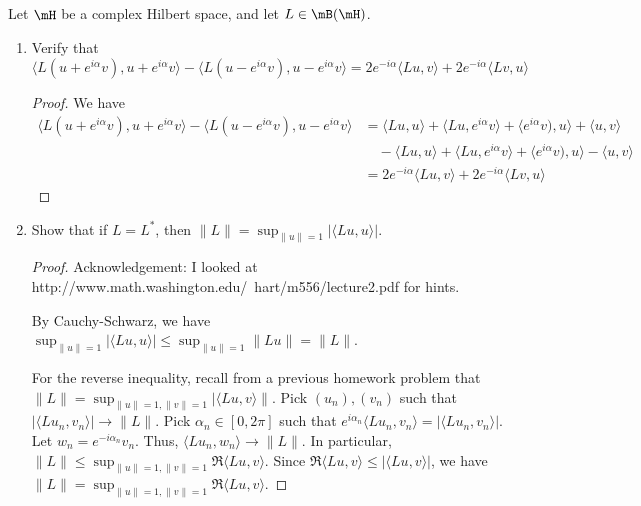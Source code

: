 \documentclass{article}
\begin{document}
 Let $\mH$ be a complex Hilbert space, and let $L \in \mB(\mH)$.
\begin{enumerate}
\item Verify that 
$\langle L(u + e^{i \alpha} v), u + e^{i \alpha} v \rangle - 
\langle L(u - e^{i \alpha} v), u - e^{i \alpha} v \rangle
= 2 e^{-i \alpha} \langle L u, v \rangle + 2 e^{-i \alpha} \langle Lv, u \rangle$

\begin{proof}
We have 
\begin{align*}
\langle L(u + e^{i \alpha} v), u + e^{i \alpha} v \rangle - 
\langle L(u - e^{i \alpha} v), u - e^{i \alpha} v \rangle
& = \langle Lu, u \rangle + \langle Lu, e^{i \alpha} v \rangle +
\langle e^{i \alpha} v), u \rangle + \langle u, v \rangle
\\ & \quad - \langle Lu, u \rangle + \langle Lu, e^{i \alpha} v \rangle +
\langle e^{i \alpha} v), u \rangle - \langle u, v \rangle
\\ & = 2 e^{-i \alpha} \langle L u, v \rangle + 2 e^{-i \alpha} \langle Lv, u \rangle
\end{align*}
\end{proof}

\item Show that if $L = L^*$, then $\|L \| = \sup_{\|u\| = 1} | \langle L u, u \rangle |$.

\begin{proof}
Acknowledgement: I looked at  http://www.math.washington.edu/~hart/m556/lecture2.pdf for hints.

By Cauchy-Schwarz, we have $\sup_{\|u\| = 1} | \langle L u, u \rangle | \le 
\sup_{\|u\| = 1} \|L u\| = \|L \|$.

For the reverse inequality, recall from a previous homework problem that $\|L\| = \sup_{\|u\| = 1, \|v\| = 1} |\langle L u, v \rangle\|$.
Pick $(u_n), (v_n)$ such that $|\langle Lu_n, v_n \rangle | \to \|L\|$.  Pick $\alpha_n \in [0, 2\pi]$ such that 
$e^{i\alpha_n} \langle Lu_n, v_n \rangle = |\langle Lu_n, v_n \rangle |$. Let $w_n = e^{-i\alpha_n} v_n$. Thus, $\langle Lu_n, w_n \rangle \to \|L\|$.
In particular, $\|L\| \le  \sup_{\|u\| = 1, \|v\| = 1} \Re \langle Lu, v \rangle$. Since $\Re \langle Lu, v \rangle \le |\langle Lu, v \rangle|$, we have $\|L\| = \sup_{\|u\| = 1, \|v\| = 1} \Re \langle Lu, v \rangle$.


\end{proof}
\end{enumerate}
\end{document}
